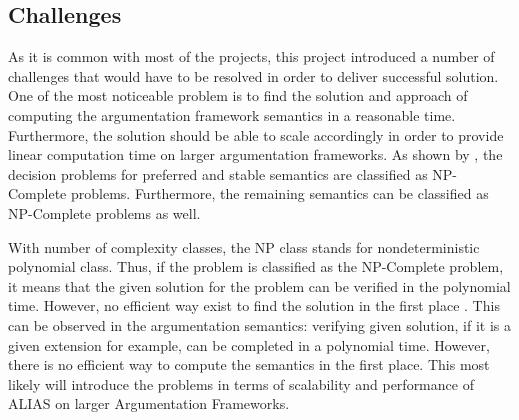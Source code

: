 \subsection{Challenges}
As it is common with most of the projects, this project introduced a number of challenges that would have to be resolved in order to deliver successful solution. One of the most noticeable problem is to find the solution and approach of computing the argumentation framework semantics in a reasonable time. Furthermore, the solution should be able to scale accordingly in order to provide linear computation time on larger argumentation frameworks. As shown by \citet{complexity}, the decision problems for preferred and stable semantics are classified as NP-Complete problems. Furthermore, the remaining semantics can be classified as NP-Complete problems as well.

With number of complexity classes, the NP class stands for nondeterministic polynomial class. Thus, if the problem is classified as the NP-Complete problem, it means that the given solution for the problem can be verified in the polynomial time. However, no efficient way exist to find the solution in the first place \citep{arora2009computational}. This can be observed in the argumentation semantics: verifying given solution, if it is a given extension for example, can be completed in a polynomial time. However, there is no efficient way to compute the semantics in the first place. This most likely will introduce the problems in terms of scalability and performance of ALIAS on larger Argumentation Frameworks. 